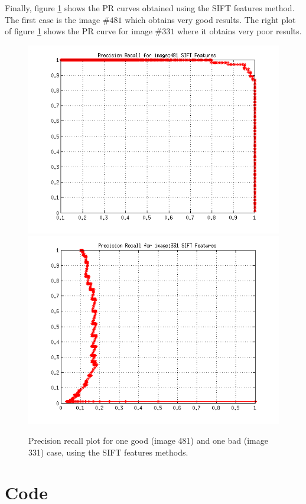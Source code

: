 \documentclass[a4paper,12pt]{article}
\begin{document}
Finally, figure \ref{fig:sgb} shows the PR curves obtained using the SIFT features method.
The first case is the image $\#481$ which obtains very good results. 
The right plot of figure \ref{fig:sgb} shows the PR curve for image $\#331$ where it obtains very poor results.
\begin{figure}[h!]
    \centering
    \includegraphics[totalheight=.24\textheight]{../Results/PR/GoodSIFT.png}
    \includegraphics[totalheight=.24\textheight]{../Results/PR/BadSIFT.png}
    \caption{Precision recall plot for one good (image 481) and one bad (image
    331) case, using the SIFT features methods.}
    \label{fig:sgb}
\end{figure}

\newpage
\section{Code}

\end{document}
